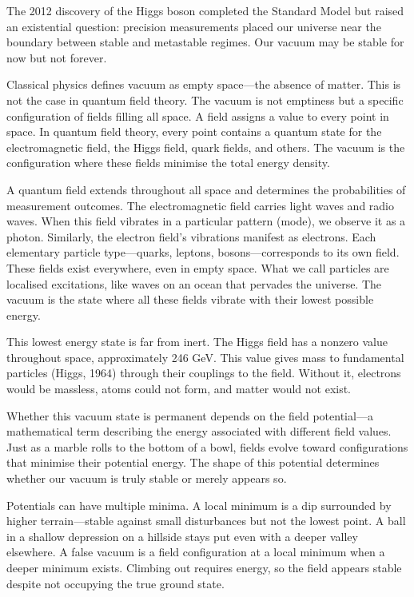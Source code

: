 
The 2012 discovery of the Higgs boson completed the Standard Model but raised an existential question: precision measurements placed our universe near the boundary between stable and metastable regimes. Our vacuum may be stable for now but not forever.

Classical physics defines vacuum as empty space—the absence of matter. This is not the case in quantum field theory. The vacuum is not emptiness but a specific configuration of fields filling all space. A field assigns a value to every point in space. In quantum field theory, every point contains a quantum state for the electromagnetic field, the Higgs field, quark fields, and others. The vacuum is the configuration where these fields minimise the total energy density.

A quantum field extends throughout all space and determines the probabilities of measurement outcomes. The electromagnetic field carries light waves and radio waves. When this field vibrates in a particular pattern (mode), we observe it as a photon. Similarly, the electron field's vibrations manifest as electrons. Each elementary particle type—quarks, leptons, bosons—corresponds to its own field. These fields exist everywhere, even in \QSOpen{}empty\QSClose{} space. What we call particles are localised excitations, like waves on an ocean that pervades the universe. The vacuum is the state where all these fields vibrate with their lowest possible energy.

This lowest energy state is far from inert. The Higgs field has a nonzero value throughout space, approximately 246 GeV. This value gives mass to fundamental particles (Higgs, 1964) through their couplings to the field. Without it, electrons would be massless, atoms could not form, and matter would not exist.

Whether this vacuum state is permanent depends on the field potential—a mathematical term describing the energy associated with different field values. Just as a marble rolls to the bottom of a bowl, fields evolve toward configurations that minimise their potential energy. The shape of this potential determines whether our vacuum is truly stable or merely appears so.

Potentials can have multiple minima. A local minimum is a dip surrounded by higher terrain—stable against small disturbances but not the lowest point. A ball in a shallow depression on a hillside stays put even with a deeper valley elsewhere. A false vacuum is a field configuration at a local minimum when a deeper minimum exists. Climbing out requires energy, so the field appears stable despite not occupying the true ground state.

